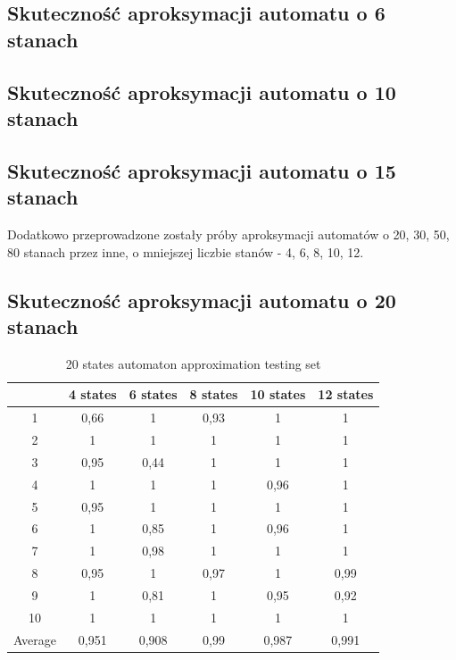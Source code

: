 \documentclass[runningheads,a4paper]{llncs}
\begin{document}
\FloatBarrier
\subsection{Skuteczność aproksymacji automatu o 6 stanach}

\FloatBarrier
\subsection{Skuteczność aproksymacji automatu o 10 stanach}

\FloatBarrier
\subsection{Skuteczność aproksymacji automatu o 15 stanach}


Dodatkowo przeprowadzone zostały próby aproksymacji automatów o 20, 30, 50, 80 stanach przez inne, o mniejszej liczbie stanów - 4, 6, 8, 10, 12.

\FloatBarrier
\subsection{Skuteczność aproksymacji automatu o 20 stanach}

\begin{table}[]
\centering
\caption{20 states automaton approximation testing set}
\label{my-label}
\begin{tabular}{@{}cccccc@{}}
\toprule
        & 4 states & 6 states & 8 states & 10 states & 12 states    \\ \midrule
1       & 0,66     & 1        & 0,93     & 1         & 1 \\
2       & 1        & 1        & 1        & 1         & 1 \\
3       & 0,95     & 0,44     & 1        & 1         & 1 \\
4       & 1        & 1        & 1        & 0,96      & 1   \\
5       & 0,95     & 1        & 1        & 1         & 1   \\
6       & 1        & 0,85     & 1        & 0,96      & 1    \\
7       & 1        & 0,98     & 1        & 1         & 1    \\
8       & 0,95     & 1        & 0,97     & 1         & 0,99     \\
9       & 1        & 0,81     & 1        & 0,95      & 0,92 \\
10      & 1        & 1        & 1        & 1         & 1  \\
Average & 0,951    & 0,908    & 0,99     & 0,987     & 0,991  \\ \bottomrule
\end{tabular}
\end{table}
\end{document}
